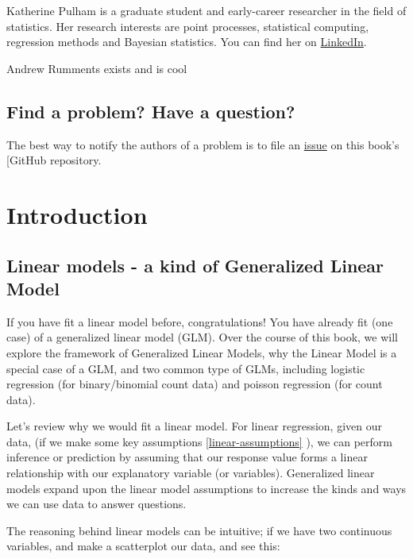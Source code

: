\documentclass[
]{book}
\begin{document}
Katherine Pulham is a graduate student and early-career researcher in the field of statistics. Her research interests are point processes, statistical computing, regression methods and Bayesian statistics. You can find her on \href{https://www.linkedin.com/in/red-noise-rose/}{LinkedIn}.

Andrew Rumments exists and is cool

\hypertarget{find-a-problem-have-a-question}{%
\section{Find a problem? Have a question?}\label{find-a-problem-have-a-question}}

The best way to notify the authors of a problem is to file an \href{https://github.com/GeneralizedRegressionModelingAgency/GRMA/issues}{issue} on this book's {[}GitHub repository.

\hypertarget{intro}{%
\chapter{Introduction}\label{intro}}

\hypertarget{linear-models---a-kind-of-generalized-linear-model}{%
\section{Linear models - a kind of Generalized Linear Model}\label{linear-models---a-kind-of-generalized-linear-model}}

If you have fit a linear model before, congratulations! You have already fit (one case) of a generalized linear model (GLM). Over the course of this book, we will explore the framework of Generalized Linear Models, why the Linear Model is a special case of a GLM, and two common type of GLMs, including logistic regression (for binary/binomial count data) and poisson regression (for count data).

Let's review why we would fit a linear model. For linear regression, given our data, (if we make some key assumptions \ref{linear-assumptions} ), we can perform inference or prediction by assuming that our response value forms a linear relationship with our explanatory variable (or variables). Generalized linear models expand upon the linear model assumptions to increase the kinds and ways we can use data to answer questions.

The reasoning behind linear models can be intuitive; if we have two continuous variables, and make a scatterplot our data, and see this:
\end{document}
